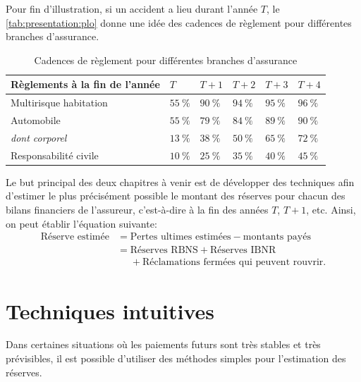 Pour fin d'illustration, si un accident a lieu durant l'année $T$, le
\autoref{tab:presentation:plo} donne une idée des cadences de
règlement pour différentes branches d'assurance.

\begin{table}
  \centering
  \caption{Cadences de règlement pour différentes branches
    d'assurance}
  \label{tab:presentation:plo}
  \begin{tabular}{llllll}
    \toprule
    Règlements à la fin de l'année  & $T$ & $T+1$ & $T+2$ & $T+3$ & $T+4$\\
    \midrule
    Multirisque habitation & $55~\%$ & $90~\%$ & $94~\%$ & $95~\%$ & $96~\%$ \\
    Automobile & $55~\%$ & $79~\%$ & $84~\%$ & $89~\%$ & $90~\%$ \\
    \textit{dont corporel} & $13~\%$ & $38~\%$ & $50~\%$ & $65~\%$ & $72~\%$ \\
    Responsabilité civile & $10~\%$ & $25~\%$ & $35~\%$ & $40~\%$ & $45~\%$ \\
    \bottomrule
  \end{tabular}
\end{table}

Le but principal des deux chapitres à venir est de développer des
techniques afin d'estimer le plus précisément possible le montant des
réserves pour chacun des bilans financiers de l'assureur, c'est-à-dire
à la fin des années $T$, $T+1$, etc. Ainsi, on peut établir l'équation
suivante:
\begin{align*}
  \text{Réserve estimée}
  &= \text{Pertes ultimes estimées} - \text{montants payés}\\
  &= \text{Réserves RBNS} + \text{Réserves IBNR} \\
  &\phantom{=} + \text{Réclamations fermées qui peuvent rouvrir}.
\end{align*}


\section{Techniques intuitives}
\label{sec:presentation:techniques}

Dans certaines situations où les paiements futurs sont très stables et
très prévisibles, il est possible d'utiliser des méthodes simples pour
l'estimation des réserves.

